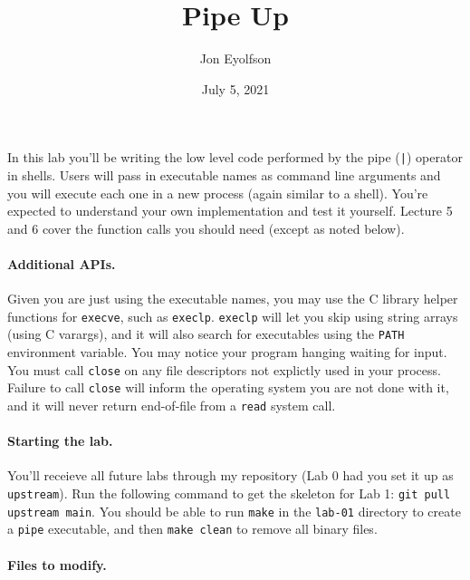 

\title{Pipe Up}
\author{Jon Eyolfson}
\date{July 5, 2021}



\maketitle

In this lab you'll be writing the low level code performed by the pipe
(\texttt{|}) operator in shells.
Users will pass in executable names as command line arguments and you will
execute each one in a new process (again similar to a shell).
You're expected to understand your own implementation and test it yourself.
Lecture 5 and 6 cover the function calls you should need (except as noted
below).

\paragraph{Additional APIs.}

Given you are just using the executable names, you may use the C library helper
functions for \texttt{execve}, such as \texttt{execlp}.
\texttt{execlp} will let you skip using string arrays (using C varargs), and it
will also search for executables using the \texttt{PATH} environment variable.
You may notice your program hanging waiting for input.
You must call \texttt{close} on any file descriptors not explictly used in
your process.
Failure to call \texttt{close} will inform the operating system you are not done
with it, and it will never return end-of-file from a \texttt{read} system call.

\paragraph{Starting the lab.}

You'll receieve all future labs through my repository (Lab 0 had you set it up
as \texttt{upstream}).
Run the following command to get the skeleton for Lab 1:
\texttt{git pull upstream main}.
You should be able to run \texttt{make} in the \texttt{lab-01} directory to
create a \texttt{pipe} executable, and then \texttt{make clean} to remove all
binary files.

\paragraph{Files to modify.}

